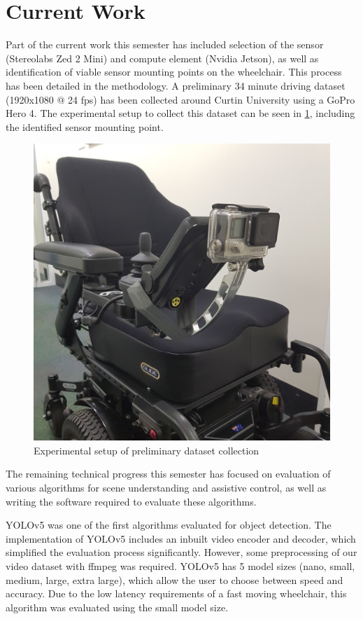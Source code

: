 \documentclass[12pt]{article}
\begin{document}
\section{Current Work}
Part of the current work this semester has included selection of the sensor (Stereolabs Zed 2 Mini) and compute element (Nvidia Jetson),
as well as identification of viable sensor mounting points on the wheelchair. This process has been detailed in the methodology.
A preliminary 34 minute driving dataset (1920x1080 @ 24 fps) has been collected around Curtin University using a GoPro Hero 4.
The experimental setup to collect this dataset can be seen in \cref{fig:gopro_dataset_collection}, including the identified
sensor mounting point.

\begin{figure}[H]
    \centering
    \includegraphics[width=0.5\linewidth,angle=270,origin=c]{images/gopro_dataset_collection.jpg}
    \caption{Experimental setup of preliminary dataset collection}
    \label{fig:gopro_dataset_collection}
\end{figure}

The remaining technical progress this semester has focused on evaluation of various algorithms for scene understanding
and assistive control, as well as writing the software required to evaluate these algorithms.

YOLOv5 \cite{ultralyticsYOLOv5} was one of the first algorithms evaluated for object detection.
The implementation of YOLOv5 includes an inbuilt video encoder and decoder, which simplified
the evaluation process significantly. However, some preprocessing of our video dataset with ffmpeg was required.
YOLOv5 has 5 model sizes (nano, small, medium, large, extra large),
which allow the user to choose between speed and accuracy.
Due to the low latency requirements of a fast moving wheelchair, this algorithm was evaluated using the small model size.
\end{document}
